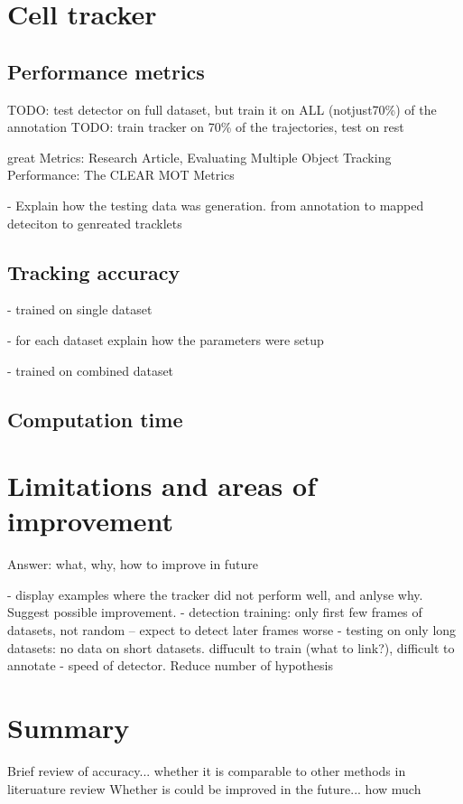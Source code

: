 \section{Cell tracker \statusnew}
	\label{sec:results_tracker}
	\subsection{Performance metrics \statusnew}
	
	TODO: test detector on full dataset, but train it on ALL (notjust70\%) of the annotation
	TODO: train tracker on 70\% of the trajectories, test on rest
	
	great Metrics: Research Article, Evaluating Multiple Object Tracking Performance: The CLEAR MOT Metrics
	
	- Explain how the testing data was generation. from annotation to mapped deteciton to genreated tracklets

	\subsection{Tracking accuracy \statusnew}
		- trained on single dataset
		
		- for each dataset explain how the parameters were setup
					
		- trained on combined dataset
	\subsection{Computation time \statusnew}
\section{Limitations and areas of improvement \statusnew}
	\label{sec:results_limitations}
	Answer: what, why, how to improve in future
			
	- display examples where the tracker did not perform well, and anlyse why. Suggest possible improvement.
	- detection training: only first few frames of datasets, not random -- expect to detect later frames worse
	- testing on only long datasets: no data on short datasets. diffucult to train (what to link?), difficult to annotate
	- speed of detector. Reduce number of hypothesis		

\section{Summary \statusnew}
	\label{sec:results_summary}
	Brief review of accuracy... whether it is comparable to other methods in literuature review
	Whether is could be improved in the future... how much